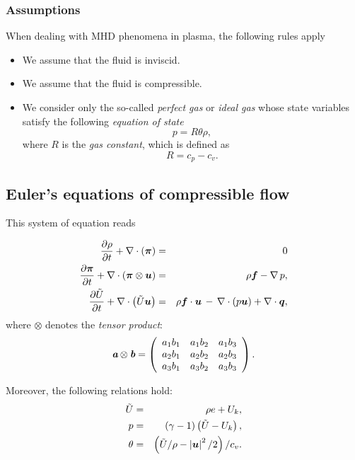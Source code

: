 \subsubsection{Assumptions}
When dealing with MHD phenomena in plasma, the following rules apply
\begin{itemize}
    \item We assume that the fluid is inviscid.
    \item We assume that the fluid is compressible.
    \item We consider only the so-called \textit{perfect gas} or \textit{ideal gas} whose state variables satisfy the following \textit{equation of state}
    \begin{equation}\label{start_therm}
    p = R\theta\rho,
    \end{equation}
    where $R$ is the \textit{gas constant}, which is defined as 
    \begin{equation}
    R = c_p - c_v.
    \end{equation} 
\end{itemize}

\subsection{Euler's equations of compressible flow}
This system of equation reads

\begin{eqnarray}
\label{ContinuityEq} \frac{\partial{\rho}}{\partial{t}} + \nabla\cdot\left(\mbox{\boldmath $\pi$}\right) & = & 0\\
\label{NSEq} \frac{\partial{\mbox{\boldmath $\pi$}}}{\partial{t}} + \nabla\cdot\left(\mbox{\boldmath $\pi$}\otimes\mbox{\boldmath $u$}\right)& = & \rho\mbox{\boldmath $f$} - \nabla\,p,\\
\label{EnergyEq} \frac{\partial{\tilde{U}}}{\partial{t}} + \nabla\cdot\left({\tilde{U}}\mbox{\boldmath $u$}\right) & = & \rho\mbox{\boldmath $f$}\cdot\mbox{\boldmath $u$} \,-\,\nabla\cdot\left({p}\mbox{\boldmath $u$}\right) + \nabla\cdot\mbox{\boldmath $q$},
\end{eqnarray}
where $\otimes$ denotes the \textit{tensor product}:
\begin{displaymath}
\textit{\textbf{a}}\otimes\textit{\textbf{b}} =
\left(
\begin{array}{ccc}
a_1b_1 & a_1b_2 & a_1b_3 \\
a_2b_1 & a_2b_2 & a_2b_3 \\
a_3b_1 & a_3b_2 & a_3b_3
\end{array}
\right).
\end{displaymath}

Moreover, the following relations hold:
\begin{eqnarray}
\tilde{U} & = & \rho e + U_k,\\
p & = & \left({}\gamma-1\right)\left({\tilde{U}}-U_k\right), \label{therm_1}\\
\theta & = & \left({\tilde{U}}/{\rho}-\left|\mbox{\boldmath $u$}\right|^2/2\right)/{c_v}.
\end{eqnarray}

